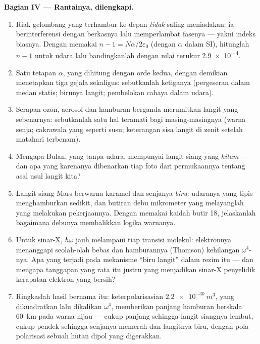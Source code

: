 \begin{problem}
\medskip\noindent\textbf{Bagian IV --- Rantainya, dilengkapi.}
\begin{enumerate}[resume]
  \item Riak gelombang yang terhambur ke depan \emph{tidak} saling
        meniadakan: ia berinterferensi dengan berkasnya lalu
        memperlambat fasenya --- yakni indeks biasnya. Dengan memakai
        $n - 1 = N\alpha/2\varepsilon_0$ (dengan $\alpha$ dalam SI),
        hitunglah $n - 1$ untuk udara lalu bandingkanlah dengan nilai
        terukur \num{2.9e-4}.
  \item Satu tetapan $\alpha$, yang dihitung dengan  orde
        kedua, dengan demikian menetapkan tiga gejala sekaligus:
        sebutkanlah ketiganya (pergeseran dalam medan statis; birunya
        langit; pembelokan cahaya dalam udara).
  \item Serapan ozon, aerosol dan hamburan berganda merumitkan langit
        yang sebenarnya: sebutkanlah satu hal teramati bagi
        masing-masingnya (warna senja; cakrawala yang seperti susu;
        keterangan sisa langit di zenit setelah matahari terbenam).
  \item Mengapa Bulan, yang tanpa udara, mempunyai langit siang yang
        \emph{hitam} --- dan apa yang karenanya dibenarkan tiap foto
        dari permukaannya tentang asal usul langit kita?
  \item Langit siang Mars berwarna karamel dan senjanya \emph{biru}:
        udaranya yang tipis menghamburkan sedikit, dan butiran debu
        mikrometer yang melayanglah yang melakukan pekerjaannya. Dengan
        memakai kaidah butir 18, jelaskanlah bagaimana debunya
        membalikkan logika warnanya.
  \item Untuk sinar-X, $\hbar\omega$ jauh melampaui tiap transisi
        molekul: elektronnya menanggapi seolah-olah bebas dan hamburannya
        (Thomson) kehilangan $\omega^4$-nya. Apa yang terjadi pada
        mekanisme ``biru langit'' dalam rezim itu --- dan mengapa
        tanggapan yang rata itu justru yang menjadikan sinar-X
        penyelidik kerapatan elektron yang bersih?
  \item Ringkaslah hasil bernama itu: keterpolarisasian
        $\qty{2.2e-30}{m^3}$, yang dikuadratkan lalu dikalikan
        $\omega^4$, memberikan panjang hamburan berskala \qty{60}{km}
        pada warna hijau --- cukup panjang sehingga langit siangnya
        lembut, cukup pendek sehingga senjanya memerah dan langitnya
        biru, dengan pola polarisasi sebuah hutan dipol yang digerakkan.
\end{enumerate}
\end{problem}
